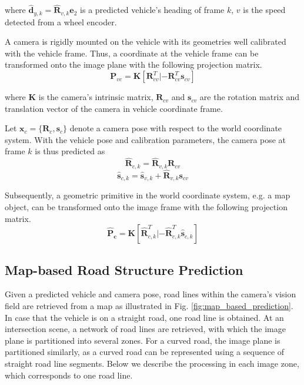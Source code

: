 \documentclass[letterpaper, 10 pt, conference]{ieeeconf}  %
\begin{document}
where $\hat{\mathbf{d}}_{y,k}=\hat{\mathbf{R}}_{v,k}\mathbf{e}_2$ is a predicted vehicle's heading of frame $k$, $v$ is the speed detected from a wheel encoder.

A camera is rigidly mounted on the vehicle with its geometries well calibrated with the vehicle frame. Thus, a coordinate at the vehicle frame can be transformed onto the image plane with the following projection matrix.
\begin{equation}
\mathbf{P}_{vc}=\mathbf{K}[\mathbf{R}_{cv}^T|-\mathbf{R}_{cv}^T\mathbf{s}_{cv}]
\end{equation}

where $\mathbf{K}$ is the camera's intrinsic matrix, $\mathbf{R}_{cv}$ and $\mathbf{s}_{cv}$ are the rotation matrix and translation vector of the camera in vehicle coordinate frame.

Let $\mathbf{x}_{c} = \{\mathbf{R}_{c}, \mathbf{s}_{c}\}$ denote a camera pose with respect to the world coordinate system. With the vehicle pose and calibration parameters, the camera pose at frame $k$ is thus predicted as
\begin{equation}
\hat{\mathbf{R}}_{c,k} = \hat{\mathbf{R}}_{v,k} \mathbf{R}_{cv}
\label{eq:R_c}
\end{equation}
\begin{equation}
\hat{\mathbf{s}}_{c,k} = \hat{\mathbf{s}}_{v,k} + \hat{\mathbf{R}}_{v,k} \mathbf{s}_{cv}
\label{eq:S_c}
\end{equation}

Subsequently, a geometric primitive in the world coordinate system, e.g. a map object, can be transformed onto the image frame with the following projection matrix.
\begin{equation}
\mathbf{\hat{P}_{c}}=\mathbf{K}[\hat{\mathbf{R}}_{c,k}^T|-\hat{\mathbf{R}}_{c,k}^T\hat{\mathbf{s}}_{c,k}]
\end{equation}

\subsection{Map-based Road Structure Prediction}

Given a predicted vehicle and camera pose, road lines within the camera's vision field are retrieved from a map as illustrated in Fig. \ref{fig:map_based_prediction}. In case that the vehicle is on a straight road, one road line is obtained. At an intersection scene, a network of road lines are retrieved, with which the image plane is partitioned into several zones. For a curved road, the image plane is partitioned similarly, as a curved road can be represented using a sequence of straight road line segments. Below we describe the processing in each image zone, which corresponds to one road line.
\end{document}
